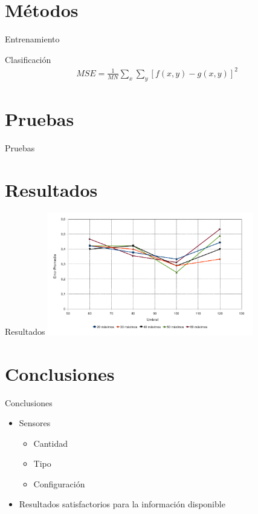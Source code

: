 \documentclass[spanish]{beamer}
\begin{document}
\section[Outline]{Métodos}

\begin{frame}{Entrenamiento}
\end{frame}

\begin{frame}{Clasificación}
  \begin{align*}
    MSE = \frac{1}{MN} \sum_x\sum_y [ f(x,y) - g(x,y) ]^{2}
  \end{align*}
\end{frame}

\section[Outline]{Pruebas}

\begin{frame}{Pruebas}
\end{frame}

\section[Outline]{Resultados}

\begin{frame}{Resultados}
  \includegraphics[width=9cm]{../diagramas/estadistica_noche_iguales}
\end{frame}

\section[Outline]{Conclusiones}

\begin{frame}{Conclusiones}
  \begin{itemize}
  \item Sensores
    \begin{itemize}
    \item Cantidad
    \item Tipo
    \item Configuración
    \end{itemize}
  \item Resultados satisfactorios para la información disponible
  \end{itemize}
\end{frame}
\end{document}
